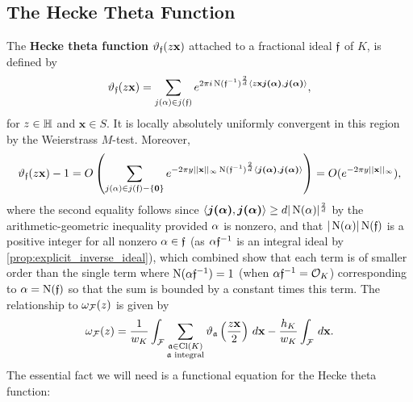     \subsection*{The Hecke Theta Function}
      The \textbf{Hecke theta function} $\vartheta_{\mathfrak{f}}(z\mathbf{x})$ attached to a fractional ideal $\mathfrak{f}$ of $K$, is defined by
      \[
        \vartheta_{\mathfrak{f}}(z\mathbf{x}) = \sum_{j(\alpha) \in j(\mathfrak{f})}e^{2\pi i\operatorname{\mathrm{N}}(\mathfrak{f}^{-1})^{\frac{2}{d}}\langle z\mathbf{x}\boldsymbol{j(\alpha)},\boldsymbol{j(\alpha)}\rangle},
      \]
      for $z \in \mathbb{H}$ and $\mathbf{x} \in S$. It is locally absolutely uniformly convergent in this region by the Weierstrass $M$-test. Moreover,
      \[
        \vartheta_{\mathfrak{f}}(z\mathbf{x})-1 = O\left(\sum_{j(\alpha) \in j(\mathfrak{f})-\{\mathbf{0}\}}e^{-2\pi y||\mathbf{x}||_{\infty}\operatorname{\mathrm{N}}(\mathfrak{f}^{-1})^{\frac{2}{d}}\langle\boldsymbol{j(\alpha)},\boldsymbol{j(\alpha)}\rangle}\right) = O(e^{-2\pi y||\mathbf{x}||_{\infty}}),
      \]
      where the second equality follows since $\langle\boldsymbol{j(\alpha)},\boldsymbol{j(\alpha)}\rangle \ge d|\operatorname{\mathrm{N}}(\alpha)|^{\frac{2}{d}}$ by the arithmetic-geometric inequality provided $\alpha$ is nonzero, and that $|\operatorname{\mathrm{N}}(\alpha)|\operatorname{\mathrm{N}}(\mathfrak{f})$ is a positive integer for all nonzero $\alpha \in \mathfrak{f}$ (as $\alpha\mathfrak{f}^{-1}$ is an integral ideal by \cref{prop:explicit_inverse_ideal}), which combined show that each term is of smaller order than the single term where $\operatorname{\mathrm{N}}(\alpha\mathfrak{f}^{-1}) = 1$ (when $\alpha\mathfrak{f}^{-1} = \mathcal{O}_{K}$) corresponding to $\alpha = \operatorname{\mathrm{N}}(\mathfrak{f})$ so that the sum is bounded by a constant times this term. The relationship to $\omega_{\mathcal{F}}(z)$ is given by
      \[
        \omega_{\mathcal{F}}(z) = \frac{1}{w_{K}}\int_{\mathcal{F}}\sum_{\substack{\mathfrak{a} \in \operatorname{\mathrm{Cl}}(K) \\ \text{$\mathfrak{a}$ integral}}}\vartheta_{\mathfrak{a}}\left(\frac{z\mathbf{x}}{2}\right)\,d\mathbf{x}-\frac{h_{K}}{w_{K}}\int_{\mathcal{F}}\,d\mathbf{x}.
      \]
      The essential fact we will need is a functional equation for the Hecke theta function:


